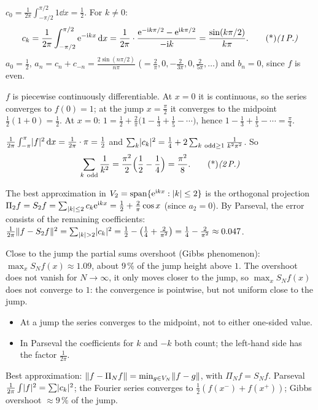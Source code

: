 \begin{solution}
 $c_0=\frac1{2\pi}\int_{-\pi/2}^{\pi/2}1\dd x=\frac12$. 
For $k\neq0$:
\[
c_k=\frac1{2\pi}\int_{-\pi/2}^{\pi/2}\e^{-\iu kx}\dd x=\frac1{2\pi}\cdot\frac{\e^{-\iu k\pi/2}-\e^{\iu k\pi/2}}{-\iu k}=\frac{\sin(k\pi/2)}{k\pi}.\ptd{1}
\]
$a_0=\frac12$, $a_n=c_n+c_{-n}=\frac{2\sin(n\pi/2)}{n\pi}$ ($=\frac2\pi,0,-\frac2{3\pi},0,\frac2{5\pi},\dots$) and $b_n=0$, since $f$ is even. 

 $f$ is piecewise continuously differentiable. At $x=0$ it is continuous, so the series converges to $f(0)=1$; at the jump $x=\frac\pi2$ it converges to the midpoint $\frac12(1+0)=\frac12$. 
At $x=0$: $1=\frac12+\frac2\pi\big(1-\frac13+\frac15-\cdots\big)$, hence $1-\frac13+\frac15-\cdots=\frac\pi4$. 

 $\frac1{2\pi}\int_{-\pi}^\pi\lvert f\rvert^2\,\mathrm{d} x=\frac1{2\pi}\cdot\pi=\frac12$ and $\sum_k\abs{c_k}^2=\frac14+2\sum_{k\ \mathrm{odd}\ge1}\frac1{k^2\pi^2}$. 
So
\[
\sum_{k\ \mathrm{odd}}\frac1{k^2}=\frac{\pi^2}2\Big(\frac12-\frac14\Big)=\frac{\pi^2}8.\ptd{2}
\]

 The best approximation in $V_2=\operatorname{span}\{\mathrm{e}^{\mathrm{i} kx}:\lvert k\rvert\le2\}$ is the orthogonal projection $\Pi_2f=S_2f=\sum_{\lvert k\rvert\le2}c_k\mathrm{e}^{\mathrm{i} kx}=\frac12+\frac2\pi\cos x$ (since $a_2=0$). 
By Parseval, the error consists of the remaining coefficients:
$\frac1{2\pi}\lVert f-S_2f\rVert^2=\sum_{\lvert k\rvert>2}\lvert c_k\rvert^2=\frac12-\big(\frac14+\frac2{\pi^2}\big)=\frac14-\frac2{\pi^2}\approx0.047$. 

 Close to the jump the partial sums overshoot (Gibbs phenomenon): $\max_xS_Nf(x)\approx1.09$, about $9\,\%$ of the jump height above $1$. The overshoot does not vanish for $N\to\infty$, it only moves closer to the jump, so $\max_xS_Nf(x)$ does not converge to $1$: the convergence is pointwise, but not uniform close to the jump. 

\begin{trap}
\begin{itemize}
\item At a jump the series converges to the midpoint, not to either one-sided value.
\item In Parseval the coefficients for $k$ and $-k$ both count; the left-hand side has the factor $\frac1{2\pi}$.
\end{itemize}
\end{trap}
\begin{heart}
Best approximation: $\lVert f-\Pi_Nf\rVert=\min_{g\in V_N}\lVert f-g\rVert$, with $\Pi_Nf=S_Nf$. Parseval $\frac1{2\pi}\int\lvert f\rvert^2=\sum\lvert c_k\rvert^2$; the Fourier series converges to $\frac12(f(x^-)+f(x^+))$; Gibbs overshoot $\approx9\,\%$ of the jump.
\end{heart}
\end{solution}

